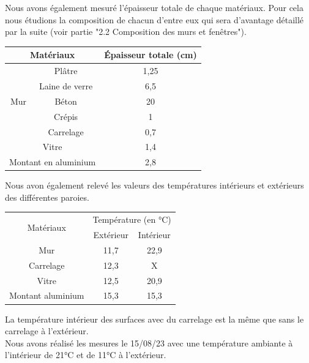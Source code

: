\documentclass[12pt, a4paper]{article}
\begin{document}
Nous avons également mesuré l'épaisseur totale de chaque matériaux. Pour cela nous étudions la composition de chacun d'entre eux qui sera d'avantage détaillé par la suite (voir partie "2.2 Composition des murs et fenêtres").

\begin{table}[!ht]
    \centering
    \begin{tabular}{|c|c|c|}
    \hline
         \multicolumn{2}{|c|}{Matériaux} & Épaisseur totale (cm) \\ \hline  \hline
        \multirow{5}{*}{Mur}& Plâtre & 1,25 \\ 
        &Laine de verre & 6,5 \\ 
        &Béton  & 20 \\
        &Crépis & 1 \\ 
        &Carrelage & 0,7 \\ \hline
                \multicolumn{2}{|c|}{Vitre}& 1,4 \\ \hline
        \multicolumn{2}{|c|}{Montant en aluminium} & 2,8 \\ \hline
    \end{tabular}
\end{table}


Nous avon également relevé les valeurs des températures intérieurs et extérieurs des différentes paroies. 


\begin{table}[!ht]
    \centering
    \begin{tabular}{|c|c|c|}
    \hline
         \multirow{2}{*}{Matériaux} & \multicolumn{2}{c|}{Température (en °C)}\\         ~ & Extérieur & Intérieur \\ \hline \hline
        Mur & 11,7 & 22,9 \\ \hline
        Carrelage & 12,3 & X \\ \hline
        Vitre & 12,5 & 20,9 \\ \hline
        Montant aluminium & 15,3 & 15,3 \\ \hline
    \end{tabular}
\end{table}

La température intérieur des surfaces avec du carrelage est la même que sans le carrelage à l'extérieur. \\
Nous avons réalisé les mesures le 15/08/23 avec une température ambiante à l'intérieur de 21°C et de 11°C à l'extérieur.\\
\end{document}
